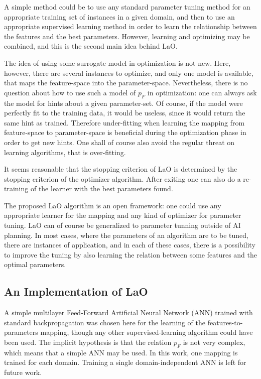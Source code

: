 \documentclass{MYsig-alternate}
\begin{document}
A simple method could be to use any standard parameter tuning method for an appropriate training set of instances in a given domain, and then to use an appropriate supervised learning method in order to learn the relationship between the features and the best parameters. However, learning and optimizing may be combined, and this is the second main idea behind LaO.

The idea of using some surrogate model in optimization is not new. Here, however, there are  several instances to optimize, and only one model is available, that maps the feature-space into the parameter-space. Nevertheless, there is no question about how to use such a model of \begin{math}p_F\end{math} in optimization: one can always ask the model for hints about a given parameter-set. Of course, if the model were perfectly fit to the training data, it would be useless, since it would return the same hint as trained. Therefore under-fitting when learning the mapping from feature-space to parameter-space is beneficial during the optimization phase in order to get new hints. One shall of course also avoid the regular threat on learning algorithms, that is over-fitting.

It seems reasonable that the stopping criterion of LaO is determined by the stopping criterion of the optimizer algorithm. After exiting one can also do a re-training of the learner with the best parameters found.

The proposed LaO algorithm is an open framework: one could use any appropriate learner for the mapping and any kind of optimizer for parameter tuning. LaO can of course be generalized to parameter tunning outside of AI planning. In most cases, where the parameters of an algorithm are to be tuned, there are instances of application, and in each of these cases, there is a possibility to improve the tuning by also learning the relation between some features and the optimal parameters.

\subsection{An Implementation of LaO}

A simple multilayer Feed-Forward Artificial Neural Network (ANN) trained with standard backpropagation was chosen here for the learning of the features-to-parameters mapping, though any other supervised-learning algorithm could have been used. The implicit hypothesis is that the relation \begin{math}p_F\end{math} is not very complex, which means that a simple ANN may be used. In this work, one mapping is trained for each domain. Training a single domain-independent ANN is left for future work.
\end{document}
